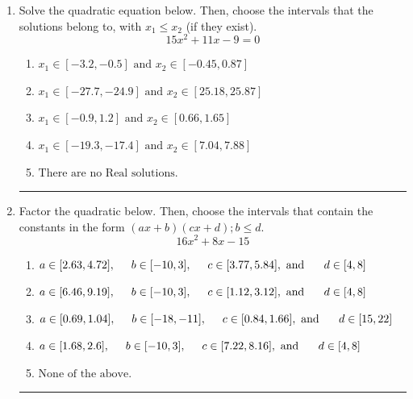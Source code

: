 \documentclass[14pt]{extbook}
\newcommand{\litem}[1]{\item#1\hspace*{-1cm}\rule{\textwidth}{0.4pt}}
\begin{document}
\begin{enumerate}
{\begin{enumerate}[label=\Alph*.]
\end{enumerate} }
\litem{
Solve the quadratic equation below. Then, choose the intervals that the solutions belong to, with $x_1 \leq x_2$ (if they exist).\[ 15x^{2} +11 x -9 = 0 \]\begin{enumerate}[label=\Alph*.]
\item \( x_1 \in [-3.2, -0.5] \text{ and } x_2 \in [-0.45, 0.87] \)
\item \( x_1 \in [-27.7, -24.9] \text{ and } x_2 \in [25.18, 25.87] \)
\item \( x_1 \in [-0.9, 1.2] \text{ and } x_2 \in [0.66, 1.65] \)
\item \( x_1 \in [-19.3, -17.4] \text{ and } x_2 \in [7.04, 7.88] \)
\item \( \text{There are no Real solutions.} \)

\end{enumerate} }
\litem{
Factor the quadratic below. Then, choose the intervals that contain the constants in the form $(ax+b)(cx+d); b \leq d.$\[ 16x^{2} +8 x -15 \]\begin{enumerate}[label=\Alph*.]
\item \( a \in [2.63, 4.72], \hspace*{5mm} b \in [-10, 3], \hspace*{5mm} c \in [3.77, 5.84], \text{ and } \hspace*{5mm} d \in [4, 8] \)
\item \( a \in [6.46, 9.19], \hspace*{5mm} b \in [-10, 3], \hspace*{5mm} c \in [1.12, 3.12], \text{ and } \hspace*{5mm} d \in [4, 8] \)
\item \( a \in [0.69, 1.04], \hspace*{5mm} b \in [-18, -11], \hspace*{5mm} c \in [0.84, 1.66], \text{ and } \hspace*{5mm} d \in [15, 22] \)
\item \( a \in [1.68, 2.6], \hspace*{5mm} b \in [-10, 3], \hspace*{5mm} c \in [7.22, 8.16], \text{ and } \hspace*{5mm} d \in [4, 8] \)
\item \( \text{None of the above.} \)


\end{enumerate}}
\end{enumerate}
\end{document}

